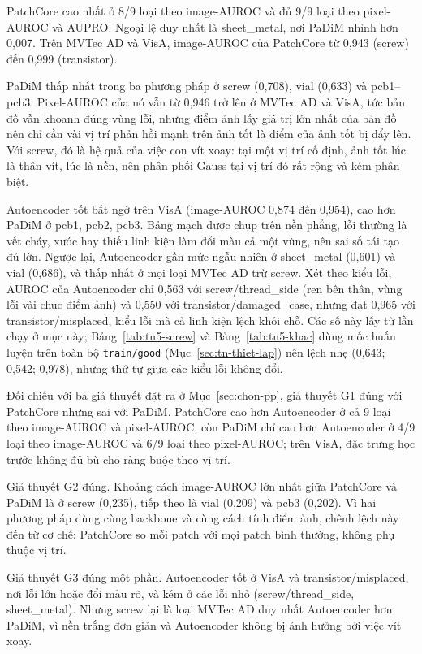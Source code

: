PatchCore cao nhất ở 8/9 loại theo image-AUROC và đủ 9/9 loại theo pixel-AUROC và AUPRO. Ngoại lệ duy nhất
là sheet\_metal, nơi PaDiM nhỉnh hơn 0,007. Trên MVTec AD và VisA, image-AUROC của PatchCore từ 0,943 (screw) đến
0,999 (transistor).

PaDiM thấp nhất trong ba phương pháp ở screw (0,708), vial (0,633) và pcb1--pcb3. Pixel-AUROC
của nó vẫn từ 0,946 trở lên ở MVTec AD và VisA, tức bản đồ vẫn khoanh đúng vùng lỗi, nhưng điểm ảnh lấy giá trị lớn
nhất của bản đồ nên chỉ cần vài vị trí phản hồi mạnh trên ảnh tốt là điểm của ảnh tốt bị đẩy lên. Với screw, đó là
hệ quả của việc con vít xoay: tại một vị trí cố định, ảnh tốt lúc là thân vít, lúc là nền, nên phân phối Gauss tại
vị trí đó rất rộng và kém phân biệt.

Autoencoder tốt bất ngờ trên VisA (image-AUROC 0,874 đến 0,954), cao hơn PaDiM ở pcb1, pcb2, pcb3. Bảng mạch
được chụp trên nền phẳng, lỗi thường là vết cháy, xước hay thiếu linh kiện làm đổi màu cả một vùng, nên sai số tái
tạo đủ lớn. Ngược lại, Autoencoder gần mức ngẫu nhiên ở sheet\_metal (0,601) và vial (0,686), và thấp nhất ở mọi loại
MVTec AD trừ screw. Xét theo kiểu lỗi, AUROC của Autoencoder chỉ 0,563 với screw/thread\_side (ren bên thân, vùng
lỗi vài chục điểm ảnh) và 0,550 với transistor/damaged\_case, nhưng đạt 0,965 với transistor/misplaced, kiểu lỗi mà
cả linh kiện lệch khỏi chỗ. Các số này lấy từ lần chạy ở mục này; Bảng~\ref{tab:tn5-screw} và
Bảng~\ref{tab:tn5-khac} dùng mốc huấn luyện trên toàn bộ \texttt{train/good} (Mục~\ref{sec:tn-thiet-lap}) nên lệch
nhẹ (0,643; 0,542; 0,978), nhưng thứ tự giữa các kiểu lỗi không đổi.

Đối chiếu với ba giả thuyết đặt ra ở Mục~\ref{sec:chon-pp}, giả thuyết G1 đúng với PatchCore nhưng sai với PaDiM.
PatchCore cao hơn Autoencoder ở cả 9 loại theo image-AUROC và pixel-AUROC, còn PaDiM chỉ cao hơn Autoencoder ở 4/9
loại theo image-AUROC và 6/9 loại theo pixel-AUROC; trên VisA, đặc trưng học trước không đủ bù cho ràng buộc theo vị
trí.

Giả thuyết G2 đúng. Khoảng cách image-AUROC lớn nhất giữa PatchCore và PaDiM là ở screw (0,235), tiếp theo là vial
(0,209) và pcb3 (0,202). Vì hai phương pháp dùng cùng backbone và cùng cách tính điểm ảnh, chênh lệch này đến từ cơ
chế: PatchCore so mỗi patch với mọi patch bình thường, không phụ thuộc vị trí.

Giả thuyết G3 đúng một phần. Autoencoder tốt ở VisA và transistor/misplaced, nơi lỗi lớn hoặc đổi màu rõ, và kém ở
các lỗi nhỏ (screw/thread\_side, sheet\_metal). Nhưng screw lại là loại MVTec AD duy nhất Autoencoder hơn PaDiM, vì
nền trắng đơn giản và Autoencoder không bị ảnh hưởng bởi việc vít xoay.

